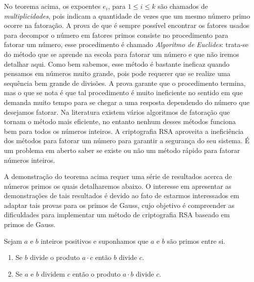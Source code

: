 No teorema acima, os expoentes $e_i$, para $1\leq i\leq k$ s\~ao chamados de \textit{multiplicidades}, pois indicam a quantidade de vezes que um mesmo n\'umero primo ocorre na fatora\c{c}\~ao. A prova de que \'e sempre poss\'ivel encontrar os fatores usados para decompor o n\'umero em fatores primos consiste no procedimento para fatorar um n\'umero, esse procedimento \'e chamado \textit{Algoritmo de Euclides}: trata-se do m\'etodo que se aprende na escola para fatorar
um n\'umero e que n\~ao iremos detalhar aqui. Como bem sabemos, esse m\'etodo \'e bastante ineficaz quando pensamos em n\'umeros muito grande, pois pode requerer que se realize uma sequ\^encia bem grande de divis\~oes. A prova garante que o procedimento termina, mas o que se nota \'e que tal procedimento \'e muito ineficiente no sentido em que demanda muito tempo para se chegar a uma resposta dependendo do n\'umero que desejamos fatorar. Na literatura existem v\'arios algoritmos de fatora\c{c}\~ao que tornam o m\'etodo mais eficiente, no entanto nenhum desses m\'etodos funciona bem para todos os n\'umeros inteiros. A criptografia RSA aproveita a inefici\^encia dos m\'etodos para fatorar um n\'umero para garantir a seguran\c{c}a do seu sistema. \'E um problema em aberto saber se existe ou n\~ao um m\'etodo r\'apido para fatorar n\'umeros inteiros.  

A demonstra\c{c}\~ao do teorema acima requer uma s\'erie de resultados acerca de n\'umeros primos os quais detalharemos abaixo. O interesse em apresentar as demonstra\c{c}\~oes de tais resultados \'e devido ao fato de estarmos interessados em adaptar tais provas para os primos de Gauss, cujo objetivo \'{e} compreender as dificuldades para implementar um m\'etodo de criptografia RSA baseado em primos de Gauss. 

\begin{Th}\label{propriedade_de_primos}
Sejam $a$ e $b$ inteiros positivos e suponhamos que $a$ e $b$ s\~ao primos entre si.
\begin{enumerate}
\item Se $b$ divide o produto $a\cdot c$ ent\~ao $b$ divide $c$.
\item Se $a$ e $b$ dividem $c$ ent\~ao o produto $a\cdot b$ divide $c$.
\end{enumerate}
\end{Th}

